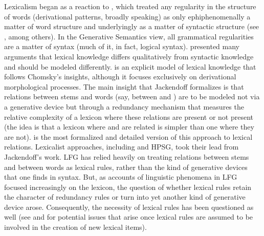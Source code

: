 \documentclass[output=paper]{langsci/langscibook}
\begin{document}
Lexicalism began as a reaction to , which treated any regularity in the structure of words (derivational patterns, broadly speaking) as only ephiphenomenally a matter of word structure and underlyingly as a matter of syntactic structure (see \citet{Lakoff1970}, among others). In the Generative Semantics view, all grammatical regularities are a matter of syntax (much of it, in fact, logical syntax). \citet{Chomsky1970} presented many arguments that lexical knowledge differs qualitatively from syntactic knowledge and should be modeled differently. \citet{Jackendoff1975} is an explicit model of lexical knowledge that follows Chomsky's insights, although it focuses exclusively on derivational morphological processes. The main insight that Jackendoff formalizes is that relations between stems and words (say, between  and ) are to be modeled not via a generative device but through a redundancy mechanism that measures the relative complexity of a lexicon where these relations are present or not present (the idea is that a lexicon where  and  are related is simpler than one where they are not). \citet{Bochner1993} is the most formalized and detailed version of this approach to lexical relations. Lexicalist approaches, including  and HPSG, took their lead from Jackendoff's work.  LFG has relied heavily on treating relations between stems and between words as lexical rules, rather than the kind of generative devices that one finds in syntax. But, as accounts of linguistic phenomena in LFG focused increasingly on the lexicon, the question of whether lexical rules retain the character of redundancy rules or turn into yet another kind of generative device arose.  Consequently, the necessity of lexical rules has been questioned as well (see \citet{KoenigandJurafsky1994} and \citet[p29-49]{Koenig1999c} for potential issues that arise once lexical rules are assumed to be involved in the creation of new lexical items). 
\end{document}
